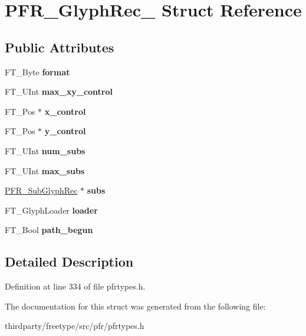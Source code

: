 \hypertarget{struct_p_f_r___glyph_rec__}{}\section{P\+F\+R\+\_\+\+Glyph\+Rec\+\_\+ Struct Reference}
\label{struct_p_f_r___glyph_rec__}
\subsection*{Public Attributes}
\begin{DoxyCompactItemize}
\item 
\mbox{\label{struct_p_f_r___glyph_rec___abc5d58759c32e126818c4d3fb82a96f7}} 
F\+T\+\_\+\+Byte {\bfseries format}
\item 
\mbox{\label{struct_p_f_r___glyph_rec___a969e9238b68a5321b8553515386440f4}} 
F\+T\+\_\+\+U\+Int {\bfseries max\+\_\+xy\+\_\+control}
\item 
\mbox{\label{struct_p_f_r___glyph_rec___a6695ea0913556d961cd18f4446b27e2d}} 
F\+T\+\_\+\+Pos $\ast$ {\bfseries x\+\_\+control}
\item 
\mbox{\label{struct_p_f_r___glyph_rec___a0447ff5f7e7323bca9a5f92374a65387}} 
F\+T\+\_\+\+Pos $\ast$ {\bfseries y\+\_\+control}
\item 
\mbox{\label{struct_p_f_r___glyph_rec___a7a4c4722bf34e3a355985f94d2614837}} 
F\+T\+\_\+\+U\+Int {\bfseries num\+\_\+subs}
\item 
\mbox{\label{struct_p_f_r___glyph_rec___a9dba53fa35c00001fdfe424a3ab269d2}} 
F\+T\+\_\+\+U\+Int {\bfseries max\+\_\+subs}
\item 
\mbox{\label{struct_p_f_r___glyph_rec___a1aa321e8408562c0c5803441e6609699}} 
\hyperlink{struct_p_f_r___sub_glyph_rec__}{P\+F\+R\+\_\+\+Sub\+Glyph\+Rec} $\ast$ {\bfseries subs}
\item 
\mbox{\label{struct_p_f_r___glyph_rec___a514784514c48497b58873de506841aba}} 
F\+T\+\_\+\+Glyph\+Loader {\bfseries loader}
\item 
\mbox{\label{struct_p_f_r___glyph_rec___afcd62048c445167a6f8548da5ea60227}} 
F\+T\+\_\+\+Bool {\bfseries path\+\_\+begun}
\end{DoxyCompactItemize}


\subsection{Detailed Description}


Definition at line 334 of file pfrtypes.\+h.



The documentation for this struct was generated from the following file\+:\begin{DoxyCompactItemize}
\item 
thirdparty/freetype/src/pfr/pfrtypes.\+h\end{DoxyCompactItemize}
